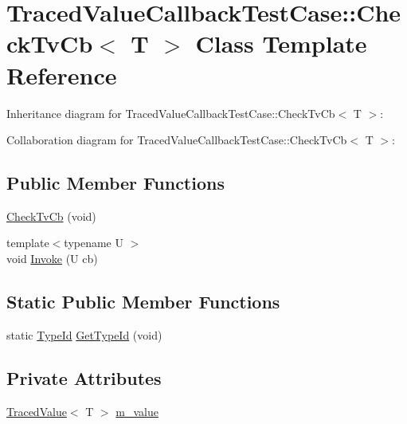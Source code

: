 \hypertarget{classTracedValueCallbackTestCase_1_1CheckTvCb}{}\section{Traced\+Value\+Callback\+Test\+Case\+:\+:Check\+Tv\+Cb$<$ T $>$ Class Template Reference}
\label{classTracedValueCallbackTestCase_1_1CheckTvCb}


Inheritance diagram for Traced\+Value\+Callback\+Test\+Case\+:\+:Check\+Tv\+Cb$<$ T $>$\+:


Collaboration diagram for Traced\+Value\+Callback\+Test\+Case\+:\+:Check\+Tv\+Cb$<$ T $>$\+:
\subsection*{Public Member Functions}
\begin{DoxyCompactItemize}
\item 
\hyperlink{classTracedValueCallbackTestCase_1_1CheckTvCb_aa32e16c5448c0ee9ac896de6f4ad8925}{Check\+Tv\+Cb} (void)
\item 
{\footnotesize template$<$typename U $>$ }\\void \hyperlink{classTracedValueCallbackTestCase_1_1CheckTvCb_aaeddb8c03e52168e45a1730ec6d7cf48}{Invoke} (U cb)
\end{DoxyCompactItemize}
\subsection*{Static Public Member Functions}
\begin{DoxyCompactItemize}
\item 
static \hyperlink{classns3_1_1TypeId}{Type\+Id} \hyperlink{classTracedValueCallbackTestCase_1_1CheckTvCb_a235097b2a2fa320df1be86bb6f203fa3}{Get\+Type\+Id} (void)
\end{DoxyCompactItemize}
\subsection*{Private Attributes}
\begin{DoxyCompactItemize}
\item 
\hyperlink{classns3_1_1TracedValue}{Traced\+Value}$<$ T $>$ \hyperlink{classTracedValueCallbackTestCase_1_1CheckTvCb_af7cf27a79d15c631a58b9838ee664f3f}{m\+\_\+value}
\end{DoxyCompactItemize}
